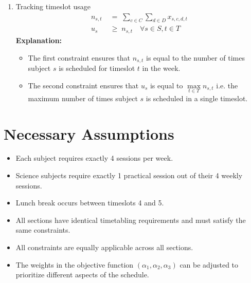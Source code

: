 \documentclass[11pt]{article}
\begin{document}
\begin{enumerate}
      \item Tracking timeslot usage
      \begin{align*}
        n_{s,t} &\;=\; \sum_{c\in C}\sum_{d\in D} x_{s,c,d,t}\\
        u_s &\;\geq\; n_{s,t} \quad \forall s \in S, t \in T
      \end{align*}
      \textbf{Explanation:}
      \begin{itemize}
        \item The first constraint ensures that \(n_{s,t}\) is equal to the number of times subject \(s\) is scheduled for timeslot \(t\) in the week.
        \item The second constraint ensures that \(u_s\) is equal to \(\max\limits_{t \in T}n_{s,t}\) i.e. the maximum number of times subject \(s\) is scheduled in a single timeslot.
      \end{itemize}
      
\end{enumerate}
\section*{Necessary Assumptions}
\begin{itemize}
    \item Each subject requires exactly 4 sessions per week.
    \item Science subjects require exactly 1 practical session out of their 4 weekly sessions.
    \item Lunch break occurs between timeslots 4 and 5.
    \item All sections have identical timetabling requirements and must satisfy the same constraints.
    \item All constraints are equally applicable across all sections.
    \item The weights in the objective function \((\alpha_1,\alpha_2,\alpha_3)\) can be adjusted to prioritize different aspects of the schedule.
\end{itemize}
\end{document}
